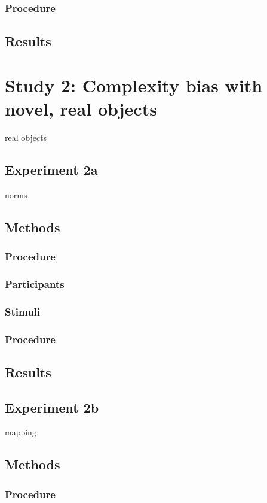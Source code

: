 \documentclass[man]{apa2}
\begin{document}
\subsubsection{Procedure}

\subsection{Results}

\section{Study 2: Complexity bias with novel, real objects} 
real objects
\subsection{\textbf{Experiment 2a}}
norms
\subsection{Methods}
\subsubsection{Procedure}
\subsubsection{Participants}
\subsubsection{Stimuli}
\subsubsection{Procedure}
\subsection{Results}


\subsection{\textbf{Experiment 2b}}
mapping
\subsection{Methods}
\subsubsection{Procedure}
\end{document}
